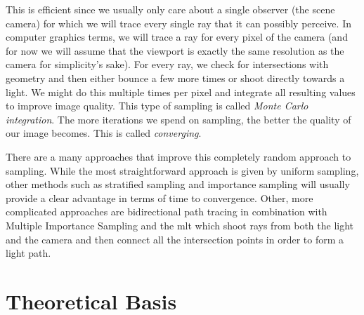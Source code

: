 \documentclass[
  twoside,
  11pt, a4paper,
  footinclude=true,
  headinclude=true,
  cleardoublepage=empty
]{scrreprt}
\begin{document}
This is efficient since we usually only care about a
single observer (the scene camera) for which we will trace every single ray that it can possibly
perceive. In computer graphics terms, we will trace a ray for every pixel of the camera (and for
now we will assume that the viewport is exactly the same resolution as the camera for simplicity's
sake). For every ray, we check for intersections with geometry and then either bounce a few more
times or shoot directly towards a light. We might do this multiple times per pixel and integrate
all resulting values to improve image
quality. This type of sampling is called \emph{Monte Carlo integration}.
The more iterations we spend on sampling, the better the
quality of our image becomes. This is called \emph{converging}.

There are a many approaches that improve this completely random approach to sampling. While the
most straightforward approach is given by uniform sampling, other methods such as stratified
sampling \cite{veach1997robust} and importance sampling \cite{veach1997robust} will usually provide
a clear advantage in terms of time to
convergence. Other, more complicated approaches are bidirectional path tracing
\cite{techreport:pbr} in combination with Multiple Importance Sampling \cite{veach1997robust}
and the \ac{mlt} \cite{inproceedings:metropolis} which shoot rays from both
the light and the camera and then connect all the intersection points in order to form a light
path.

\section{Theoretical Basis}
\end{document}
